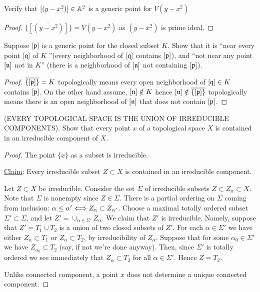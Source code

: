 \documentclass[11pt,fleqn]{book}
\begin{document}
\begin{exr}
Verify that $[(y - x^2)]\in\mathbb A^2$  is a generic point for $V(y - x^2)$
\end{exr}
\begin{proof}
$\overline{\{[(y-x^2)]\}}=V(y-x^2)$ as $(y-x^2)$ is prime ideal.
\end{proof}

\begin{exr}
Suppose $[{\mathfrak p}]$ is a generic point for the closed subset $K$. Show that it is ``near every point $[\mathfrak q]$ of $K$ ''(every neighborhood of $[\mathfrak q]$ contains $[{\mathfrak p}]$), and ``not near any point $[{\mathfrak n}]$ not in $K$'' (there is a neighborhood of $[{\mathfrak n}]$ not containing $[{\mathfrak p}]$).
\end{exr}
\begin{proof}
$\overline{\{[{\mathfrak p}]\}}=K$ topologically means every open neighborhood of $[\mathfrak q]\in K$ contains $[{\mathfrak p}]$. On the other hand assume, $[{\mathfrak n}]\notin K$ hence $[{\mathfrak n}]\notin \overline{\{[{\mathfrak p}]\}}$ topologically means there is an open neighborhood of $[{\mathfrak n}]$ that does not contain $[{\mathfrak p}]$.
\end{proof}

\begin{exr}\label{chap3exr:UNION_OF IRREDUCIBLE_COMPONENTS}
(EVERY TOPOLOGICAL SPACE IS THE UNION OF IRREDUCIBLE COMPONENTS). Show that every point $x$ of a topological space $X$ is contained in an irreducible component of $X$.
\end{exr}
\begin{proof}
The point $\{x\}$ as a subset is irreducible. 

\underline{Claim}: Every irreducible subset $Z\subset X$ is contained in an irreducible component.

Let $Z\subset X$ be irreducible. Consider the set $\Sigma$ of irreducible subsets $Z\subset Z_\alpha\subset X$. Note that $\Sigma$ is nonempty since $Z\in \Sigma$. There is a partial ordering on $\Sigma$ coming from inclusion: $\alpha\leq \alpha'\Longleftrightarrow Z_\alpha\subset Z_{\alpha'}$. Choose a maximal totally ordered subset $\Sigma' \subset \Sigma$, and let $Z'=\cup_{\alpha\in \Sigma'}Z_\alpha$. We claim that $Z'$ is irreducible. Namely, suppose that $Z'=T_1\cup T_2$ is a union of two closed subsets of $Z'$. For each $\alpha\in \Sigma'$ we have either $Z_\alpha\subset T_1$ or $Z_\alpha\subset T_2$, by irreducibility of $Z_\alpha$. Suppose that for some $\alpha_0\in \Sigma'$ we have $Z_{\alpha_0}\subset T_2$ (say, if not we're done anyway). Then, since $\Sigma'$ is totally ordered we see immediately that $Z_\alpha\subset T_2$ for all $\alpha\in \Sigma'$. Hence $Z=T_2$.

Unlike connected component, a point $x$ does not determine a unique connected component.
\end{proof}
\end{document}
